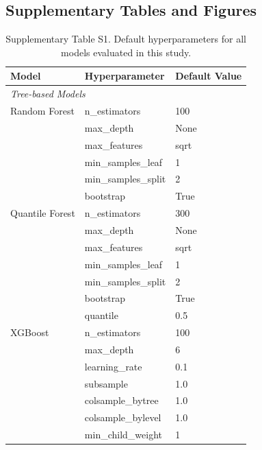 \documentclass[pdflatex,sn-mathphys-num]{sn-jnl}%
\theoremstyle{thmstyleone}%
\theoremstyle{thmstyletwo}%
\theoremstyle{thmstylethree}%
\begin{document}
\noindent



\begin{appendices}

\section{Supplementary Tables and Figures}

\begin{table}[h]
\centering
\caption{Supplementary Table S1. Default hyperparameters for all models evaluated in this study.}
\label{tab:supp_s1_hyperparameters}
\begin{tabular}{@{}lll@{}}
\toprule
\textbf{Model} & \textbf{Hyperparameter} & \textbf{Default Value} \\ 
\midrule
\multicolumn{3}{l}{\textit{Tree-based Models}} \\
\midrule
Random Forest & n\_estimators & 100 \\
              & max\_depth & None \\
              & max\_features & sqrt \\
              & min\_samples\_leaf & 1 \\
              & min\_samples\_split & 2 \\
              & bootstrap & True \\
\addlinespace
Quantile Forest & n\_estimators & 300 \\
                & max\_depth & None \\
                & max\_features & sqrt \\
                & min\_samples\_leaf & 1 \\
                & min\_samples\_split & 2 \\
                & bootstrap & True \\
                & quantile & 0.5 \\
\addlinespace
XGBoost & n\_estimators & 100 \\
        & max\_depth & 6 \\
        & learning\_rate & 0.1 \\
        & subsample & 1.0 \\
        & colsample\_bytree & 1.0 \\
        & colsample\_bylevel & 1.0 \\
        & min\_child\_weight & 1 \\

\end{tabular}
\end{table}
\end{appendices}
\end{document}

